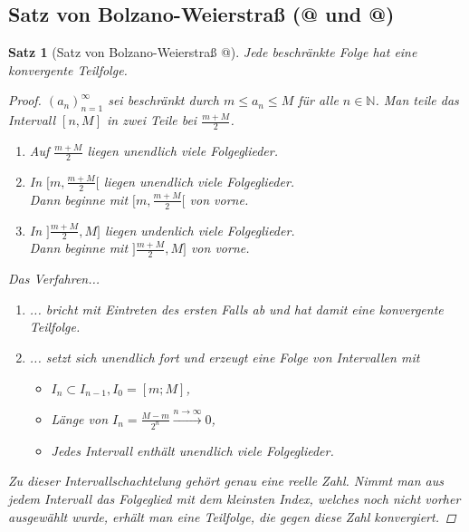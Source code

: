 \documentclass{article}
\makeatletter
\newtheorem{thm}{Satz}[section]
\newcommand*{\rom}[1]{\expandafter\@slowromancap\romannumeral #1@}
\makeatother
\begin{document}
	\subsection{Satz von Bolzano-Weierstraß (\rom{1} und \rom{2})}
	\begin{thm}[Satz von Bolzano-Weierstraß \rom{1}]
		Jede beschränkte Folge hat eine konvergente Teilfolge.
		
		\begin{proof} \((a_n)_{n=1}^{\infty}\) sei beschränkt durch \(m \leq a_n \leq M\) für alle \(n \in \mathbb{N}\). Man teile das Intervall \([n,M]\) in zwei Teile bei \(\frac{m+M}{2}\).
			\begin{enumerate}[label=\theenumi . Fall:]
				\item Auf \(\frac{m+M}{2}\) liegen unendlich viele Folgeglieder.
				\item In \([m, \frac{m+M}{2}[\) liegen unendlich viele Folgeglieder. \\Dann beginne mit \([m, \frac{m+M}{2}[\) von vorne.
				\item In \(]\frac{m+M}{2}, M]\) liegen undenlich viele Folgeglieder. \\Dann beginne mit \(]\frac{m+M}{2}, M]\) von vorne.
			\end{enumerate}
			\newpage
			\par
			Das Verfahren...
			\begin{enumerate}[label=(\alph*)]
				\item ... bricht mit Eintreten des ersten Falls ab und hat damit eine konvergente Teilfolge.
				\item ... setzt sich unendlich fort und erzeugt eine Folge von Intervallen mit
				\begin{itemize}
					\item \(I_n \subset I_{n-1}, I_0 = [m;M]\),
					\item Länge von \(I_n = \frac{M-m}{2^n} \stackrel{n \to \infty}{\to} 0\),
					\item Jedes Intervall enthält unendlich viele Folgeglieder.
				\end{itemize}
			\end{enumerate}
			\par
			Zu dieser Intervallschachtelung gehört genau eine reelle Zahl. Nimmt man aus jedem Intervall das Folgeglied mit dem kleinsten Index, welches noch nicht vorher ausgewählt wurde, erhält man eine Teilfolge, die gegen diese Zahl konvergiert.
		\end{proof}
	\end{thm}
	
\end{document}
